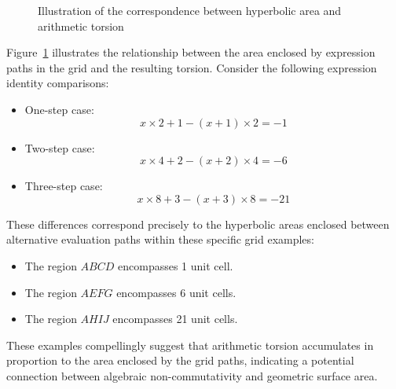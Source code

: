 \begin{figure}[ht]
    \centering
    \caption{Illustration of the correspondence between hyperbolic area and arithmetic torsion}\label{fig:area-formula}
\end{figure}

Figure~\ref{fig:area-formula} illustrates the relationship between the area enclosed by expression paths in the grid and the resulting torsion. Consider the following expression identity comparisons:

\begin{itemize}
    \item One-step case:
    \begin{equation}
        x \times 2 + 1 - (x + 1) \times 2 = -1
    \end{equation}

    \item Two-step case:
    \begin{equation}
        x \times 4 + 2 - (x + 2) \times 4 = -6
    \end{equation}

    \item Three-step case:
    \begin{equation}
        x \times 8 + 3 - (x + 3) \times 8 = -21
    \end{equation}
\end{itemize}

These differences correspond precisely to the hyperbolic areas enclosed between alternative evaluation paths within these specific grid examples:

\begin{itemize}
    \item The region $ABCD$ encompasses 1 unit cell.
    \item The region $AEFG$ encompasses 6 unit cells.
    \item The region $AHIJ$ encompasses 21 unit cells.
\end{itemize}
These examples compellingly suggest that arithmetic torsion accumulates in proportion to the area enclosed by the grid paths, indicating a potential connection between algebraic non-commutativity and geometric surface area.

